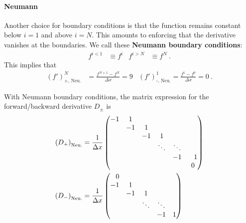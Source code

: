 \paragraph{Neumann} Another choice for boundary conditions is that the function remains constant below $i=1$ and above $i=N$. This amounts to enforcing that the derivative vanishes at the boundaries. We call these \textbf{Neumann boundary conditions}:
\begin{align}
    f^{i<1} &\equiv f^i
    &
    f^{i>N} &\equiv f^N \ .
\end{align}
This implies that 
\begin{align}
  (f')^N_\text{+, Neu.} &= \frac{f^{N+1} - f^N}{\Delta x} 
  = 
  9
  &
 (f')^1_\text{-, Neu.} = \frac{f^{1} - f^0}{\Delta x} 
  = 
  0
  \ .
\end{align}
\begin{example}
With Neumann boundary conditions, the matrix expression for the forward/backward derivative $D_\pm$ is
\begin{align}
    \left(D_+\right)_\text{Neu.}
    &=
    \frac{1}{\Delta x}
    \begin{pmatrix}
        -1 & 1 & & &  \\
        & -1 & 1 & &  \\
        & & -1 & 1 &  \\
        & & & \ddots & \ddots &  \\
        & & & & -1 & \pp 1 \\
        & & & & & 0 
    \end{pmatrix}
    \\
    \left(D_-\right)_\text{Neu.}
    &=
    \frac{1}{\Delta x}
    \begin{pmatrix}
        \pp 0 & & & &  \\
         -1 & 1 & &  \\
        & -1 & 1 &  \\
         & & \ddots & \ddots &  \\
        & & & -1 &  1 
    \end{pmatrix}
\end{align}
\end{example}


